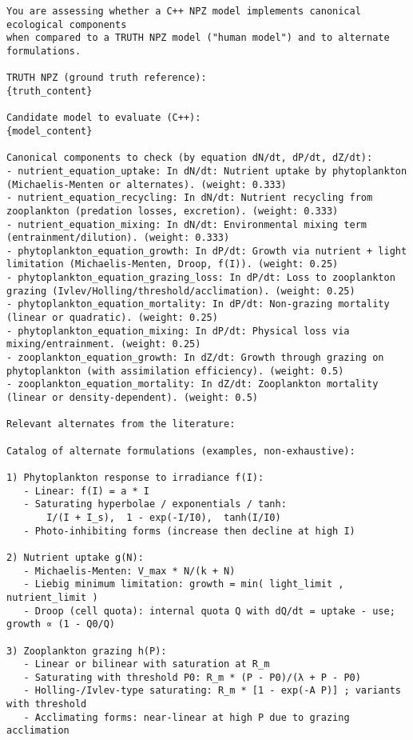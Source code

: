 \begin{lstlisting}[basicstyle=\tiny\ttfamily, breaklines=true]
You are assessing whether a C++ NPZ model implements canonical ecological components
when compared to a TRUTH NPZ model ("human model") and to alternate formulations.

TRUTH NPZ (ground truth reference):
{truth_content}

Candidate model to evaluate (C++):
{model_content}

Canonical components to check (by equation dN/dt, dP/dt, dZ/dt):
- nutrient_equation_uptake: In dN/dt: Nutrient uptake by phytoplankton (Michaelis-Menten or alternates). (weight: 0.333)
- nutrient_equation_recycling: In dN/dt: Nutrient recycling from zooplankton (predation losses, excretion). (weight: 0.333)
- nutrient_equation_mixing: In dN/dt: Environmental mixing term (entrainment/dilution). (weight: 0.333)
- phytoplankton_equation_growth: In dP/dt: Growth via nutrient + light limitation (Michaelis-Menten, Droop, f(I)). (weight: 0.25)
- phytoplankton_equation_grazing_loss: In dP/dt: Loss to zooplankton grazing (Ivlev/Holling/threshold/acclimation). (weight: 0.25)
- phytoplankton_equation_mortality: In dP/dt: Non-grazing mortality (linear or quadratic). (weight: 0.25)
- phytoplankton_equation_mixing: In dP/dt: Physical loss via mixing/entrainment. (weight: 0.25)
- zooplankton_equation_growth: In dZ/dt: Growth through grazing on phytoplankton (with assimilation efficiency). (weight: 0.5)
- zooplankton_equation_mortality: In dZ/dt: Zooplankton mortality (linear or density-dependent). (weight: 0.5)

Relevant alternates from the literature:

Catalog of alternate formulations (examples, non-exhaustive):

1) Phytoplankton response to irradiance f(I):
   - Linear: f(I) = a * I
   - Saturating hyperbolae / exponentials / tanh:
       I/(I + I_s),  1 - exp(-I/I0),  tanh(I/I0)
   - Photo-inhibiting forms (increase then decline at high I)

2) Nutrient uptake g(N):
   - Michaelis-Menten: V_max * N/(k + N)
   - Liebig minimum limitation: growth = min( light_limit , nutrient_limit )
   - Droop (cell quota): internal quota Q with dQ/dt = uptake - use; growth ∝ (1 - Q0/Q)

3) Zooplankton grazing h(P):
   - Linear or bilinear with saturation at R_m
   - Saturating with threshold P0: R_m * (P - P0)/(λ + P - P0)
   - Holling-/Ivlev-type saturating: R_m * [1 - exp(-A P)] ; variants with threshold
   - Acclimating forms: near-linear at high P due to grazing acclimation


\end{lstlisting}
